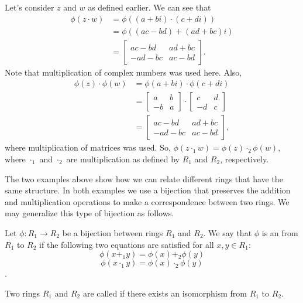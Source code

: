\begin{example}
Let's consider $z$ and $w$ as defined earlier.  We can see that
\begin{align*}
\phi(z\cdot w)&=\phi((a+bi)\cdot(c+di))\\
&=\phi((ac-bd)+(ad+bc)i)\\
&=
\begin{bmatrix}
ac-bd & ad+bc\\
-ad-bc & ac-bd
\end{bmatrix}.
\end{align*}
Note that multiplication of complex numbers was used here.  Also,
\begin{align*}
\phi(z)\cdot\phi(w)&=\phi(a+bi)\cdot\phi(c+di)\\
&=
\begin{bmatrix}
a & b\\
-b & a
\end{bmatrix}\cdot
\begin{bmatrix}
c & d\\
-d & c
\end{bmatrix}\\
&=
\begin{bmatrix}
ac-bd & ad+bc\\
-ad-bc & ac-bd
\end{bmatrix}, 
\end{align*}
where multiplication of matrices was used.  So, $\phi(z\cdot_1 w)=\phi(z)\cdot_2\phi(w)$, where $\cdot_1$ and $\cdot_2$ are multiplication as defined by $R_1$ and $R_2$, respectively.   
\end{example}
The two examples above show how we can relate different rings that have the same structure. In both examples we use a bijection that preserves the addition and multiplication operations to make a correspondence between two rings. We may generalize this type of bijection as follows.

\begin{defn}\label{Isomorphism}
Let $\phi:R_1\rightarrow R_2$ be a bijection between rings $R_1$ and $R_2$.  We say that $\phi$ is an  from $R_1$ to $R_2$ if the following two equations are satisfied for all $x,y\in R_1$:
\begin{equation}\label{iso_add}
\phi(x+_1y)=\phi(x)+_2\phi(y)
\end{equation}
\begin{equation}\label{iso_mult}
\phi(x\cdot_1y)=\phi(x)\cdot_2\phi(y)
\end{equation}.

Two rings $R_1$ and $R_2$ are called  if there exists an isomorphism from $R_1$ to $R_2$.
\end{defn}

